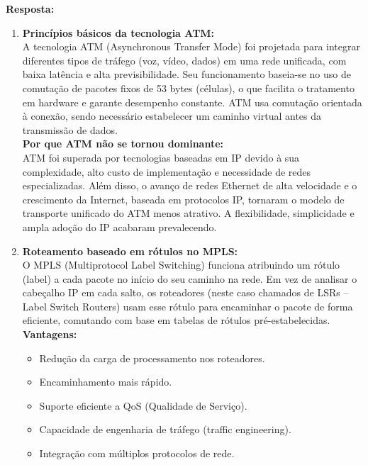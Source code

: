 \noindent
\textbf{Resposta:} \\
\begin{enumerate}[label=\alph*.]
    \item \textbf{Princípios básicos da tecnologia ATM:} \\
    A tecnologia ATM (Asynchronous Transfer Mode) foi projetada para integrar diferentes tipos de tráfego (voz, vídeo, dados) em uma rede unificada, com baixa latência e alta previsibilidade. Seu funcionamento baseia-se no uso de comutação de pacotes fixos de 53 bytes (células), o que facilita o tratamento em hardware e garante desempenho constante. ATM usa comutação orientada à conexão, sendo necessário estabelecer um caminho virtual antes da transmissão de dados.\\

    \textbf{Por que ATM não se tornou dominante:} \\
    ATM foi superada por tecnologias baseadas em IP devido à sua complexidade, alto custo de implementação e necessidade de redes especializadas. Além disso, o avanço de redes Ethernet de alta velocidade e o crescimento da Internet, baseada em protocolos IP, tornaram o modelo de transporte unificado do ATM menos atrativo. A flexibilidade, simplicidade e ampla adoção do IP acabaram prevalecendo.

    \item \textbf{Roteamento baseado em rótulos no MPLS:} \\
    O MPLS (Multiprotocol Label Switching) funciona atribuindo um rótulo (label) a cada pacote no início do seu caminho na rede. Em vez de analisar o cabeçalho IP em cada salto, os roteadores (neste caso chamados de LSRs – Label Switch Routers) usam esse rótulo para encaminhar o pacote de forma eficiente, comutando com base em tabelas de rótulos pré-estabelecidas.\\

    \textbf{Vantagens:}
    \begin{itemize}
        \item Redução da carga de processamento nos roteadores.
        \item Encaminhamento mais rápido.
        \item Suporte eficiente a QoS (Qualidade de Serviço).
        \item Capacidade de engenharia de tráfego (traffic engineering).
        \item Integração com múltiplos protocolos de rede.
    \end{itemize}


\end{enumerate}
